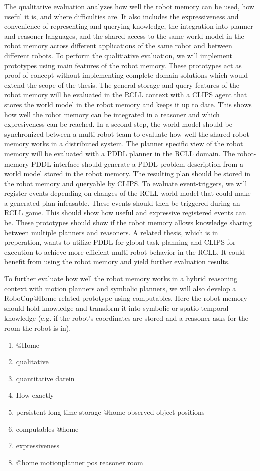 \documentclass[a4paper,11pt]{article}
\begin{document}
The qualitative evaluation analyzes how well the robot memory can be
used, how useful it is, and where difficulties are. It also includes
the expressiveness and convenience of representing and querying
knowledge, the integration into planner and reasoner languages, and
the shared access to the same world model in the robot memory across
different applications of the same robot and between different
robots. To perform the qualitiative evaluation, we will implement
prototypes using main features of the robot memory. These prototypes
act as proof of concept without implementing complete domain solutions
which would extend the scope of the thesis.
%
The general storage and query features of the robot memory will be
evaluated in the RCLL context with a CLIPS agent that stores the world
model in the robot memory and keeps it up to date. This shows how well
the robot memory can be integrated in a reasoner and which
expresiveness can be reached. In a second step, the world model should
be synchronized between a multi-robot team to evaluate how well the
shared robot memory works in a distributed system.
%
The planner specific view of the robot memory will be evaluated with a
PDDL planner in the RCLL domain. The robot-memory-PDDL interface
should generate a PDDL problem description from a world model stored
in the robot memory. The resulting plan should be stored in the robot
memory and queryable by CLIPS.
%
To evaluate event-triggers, we will register events depending on
changes of the RCLL world model that could make a generated plan
infeasable. These events should then be triggered during an RCLL
game. This should show how useful and expressive registered events can
be.
% 
These prototypes should show if the robot memory allows knowledge
sharing between multiple planners and reasoners. A related thesis,
which is in preperation, wants to utilize PDDL for global task
planning and CLIPS for execution to achieve more efficient multi-robot
behavior in the RCLL. It could benefit from using the robot memory and
yield further evaluation results.

To further evaluate how well the robot memory works in a hybrid
reasoning context with motion planners and symbolic planners, we will
also develop a RoboCup@Home related prototype using computables. Here
the robot memory should hold knowledge and transform it into symbolic
or spatio-temporal knowledge (e.g. if the robot's coordinates are
stored and a reasoner asks for the room the robot is in).



\begin{enumerate}
\item @Home
\item qualitative
\item quantitative darein
\item How exactly
\item persistent-long time storage @home observed object positions
\item computables @home
\item expressiveness
\item @home motionplanner pos reasoner room
\end{enumerate}
\end{document}
